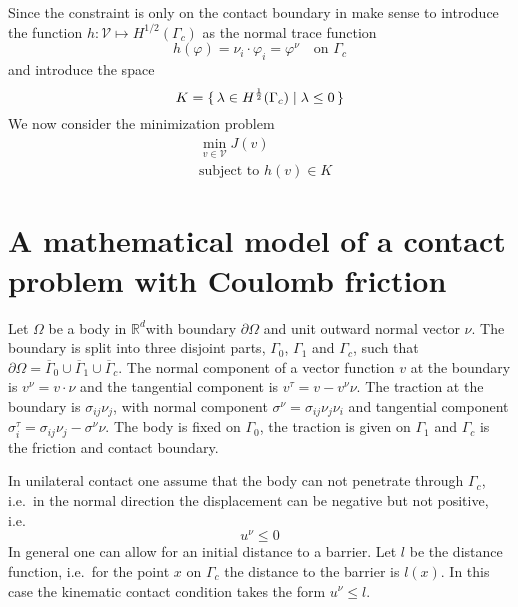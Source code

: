 \documentclass[12pt,a4paper]{article}
\numberwithin{equation}{section}
\numberwithin{table}{section}
\numberwithin{figure}{section}
\newcommand{\R}{\ensuremath{\mathbb{R}}}
\newcommand{\Rd}{\ensuremath{\R^d}}
\newcommand{\half}{\ensuremath{\frac{1}{2}}}
\newcommand{\dOmega}{{\partial\Omega}}
\newcommand{\V}{\ensuremath{\mathcal{V}}}
\renewcommand{\phi}{\varphi}
\newcommand{\stress}[1][]{\ensuremath{\sigma_{#1}}}
\newcommand{\sigij}{\stress[ij]}
\begin{document}
Since the constraint is only on the contact boundary in make sense to introduce the function $h : \V \mapsto H^{1/2}(\Gamma_c)$ as the normal trace function
\begin{equation}
  h(\phi) = \nu_i\cdot\phi_i = \phi^\nu \quad \text{on $\Gamma_c$}
\end{equation}
and introduce the space
\begin{equation}
  K = \set{\lambda \in H^\half(\Gamma_c) | \lambda \le 0}
\end{equation}
We now consider the minimization problem 
\begin{equation}
  \begin{split}
    &\min_{v\in\V} J(v) \\
    &\text{subject to $h(v) \in K$}
  \end{split}
\end{equation}



\section{A mathematical model of a contact problem with Coulomb friction}
\label{sec:math-model-cont}

Let $\Omega$ be a body in \Rd with boundary $\dOmega$ and unit outward normal vector
$\nu$.  The boundary is split into three disjoint parts, $\Gamma_0$, $\Gamma_1$ and
$\Gamma_c$, such that $\dOmega = \overline{\Gamma}_0 \cup \overline{\Gamma}_1 \cup
\overline{\Gamma}_c$.  The normal component of a vector function $v$ at the boundary is
$v^\nu = v\cdot\nu$ and the tangential component is $v^\tau = v - v^\nu \nu$.  The
traction at the boundary is $\sigij\nu_j$, with normal component $\sigma^\nu =
\sigij\nu_j\nu_i$ and tangential component $\sigma_i^\tau = \sigij\nu_j - \sigma^\nu \nu$.
The body is fixed on $\Gamma_0$, the traction is given on $\Gamma_1$ and $\Gamma_c$ is the
friction and contact boundary.

In unilateral contact one assume that the body can not penetrate
through $\Gamma_c$, i.e.\ in the normal direction the displacement can
be negative but not positive, i.e.\
\begin{equation}
  u^\nu \le 0
\end{equation}
In general one can allow for an initial distance to a barrier. Let $l$
be the distance function, i.e.\ for the point $x$ on $\Gamma_c$ the
distance to the barrier is $l(x)$.  In this case the kinematic contact
condition takes the form $u^\nu \le l$.
\end{document}
